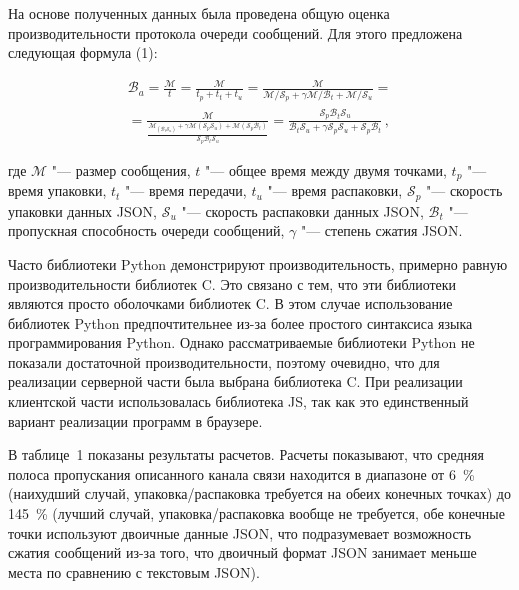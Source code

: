 На основе полученных данных была проведена общую оценка производительности протокола очереди сообщений. Для этого предложена следующая формула (1): 

\begin{equation}
\begin{split}
\label{eq:example}
\mathcal{B}_a = \frac{\mathcal{M}}{t}
= \frac{\mathcal{M}}{t_p + t_t + t_u}
= \frac{\mathcal{M}}
{\mathcal{M} / \mathcal{S}_p + 
	\gamma\mathcal{M} / \mathcal{B}_t + 
	\mathcal{M} / \mathcal{S}_u} = \\
= \frac{\mathcal{M}}
{\frac{\mathcal{M}_(\mathcal{B}_t\mathcal{S}_u) +
		\gamma
		\mathcal{M}(\mathcal{S}_p\mathcal{S}_u) +
		\mathcal{M}(\mathcal{S}_p\mathcal{B}_t)} 
	{\mathcal{S}_p\mathcal{B}_t\mathcal{S}_u}
}
=\frac{\mathcal{S}_p\mathcal{B}_t\mathcal{S}_u}
{\mathcal{B}_t\mathcal{S}_u + \gamma\mathcal{S}_p\mathcal{S}_u + \mathcal{S}_p\mathcal{B}_t}\,,
\end{split}
\end{equation}

\noindent где ${\mathcal{M}}$ "--- размер сообщения, $t$ "--- общее время между двумя точками, $t_p$ "--- время упаковки, $t_t$ "--- время передачи, $t_u$ "--- время распаковки, $\mathcal{S}_p$ "--- скорость упаковки данных JSON, $\mathcal{S}_u$ "--- скорость распаковки данных JSON, $\mathcal{B}_t$ "--- пропускная способность очереди сообщений, $\gamma$ "--- степень сжатия JSON.

Часто библиотеки Python демонстрируют производительность, примерно равную производительности библиотек C. Это связано с тем, что эти библиотеки являются просто оболочками библиотек C. В этом случае использование библиотек Python предпочтительнее из-за более простого синтаксиса языка программирования Python. Однако рассматриваемые библиотеки Python не показали достаточной производительности, поэтому очевидно, что для реализации серверной части была выбрана библиотека C. При реализации клиентской части использовалась библиотека JS, так как это единственный вариант реализации программ в браузере.

В таблице~1 показаны результаты расчетов. Расчеты показывают, что средняя полоса пропускания описанного канала связи находится в диапазоне от \SI{6}{\percent} (наихудший случай, упаковка/распаковка требуется на обеих конечных точках) до \SI{145}{\percent} (лучший случай, упаковка/распаковка вообще не требуется, обе конечные точки используют двоичные данные JSON, что подразумевает возможность сжатия сообщений из-за того, что двоичный формат JSON занимает меньше места по сравнению с текстовым JSON).

